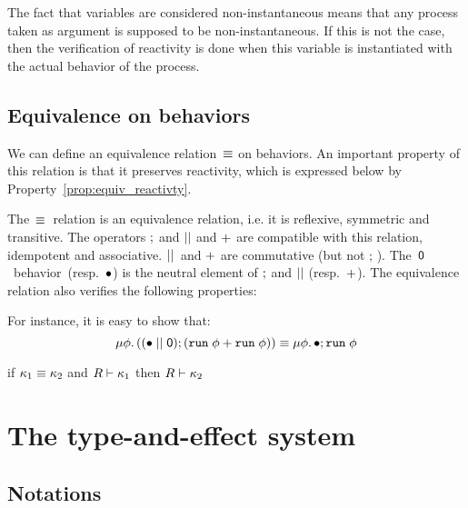 \documentclass[9pt,preprint]{sigplanconf}
\begin{document}
The fact that variables are considered non-instantaneous means that any process taken as argument is supposed to be non-instantan\-eous. If this is not the case, then the verification of reactivity is done when this variable is instantiated with the actual behavior of the process.

\subsection{Equivalence on behaviors}
\label{sec:equiv_behaviors}

We can define an equivalence relation~$\equiv$ on behaviors. An important property of this relation is that it preserves reactivity, which is expressed below by Property~\ref{prop:equiv_reactivty}.

The~$\equiv$~relation is an equivalence relation, i.e. it is reflexive, symmetric and transitive. The operators $;$ and $ \mid\mid $ and $+$ are compatible with this relation, idempotent and associative. $ \mid\mid $~and $+$ are commutative (but not $;\,$). The~$\textsf{0}$~behavior~(resp.~$\bullet$) is the neutral element of $;$ and $ \mid\mid $ (resp.~$+$). The equivalence relation also verifies the following properties:
%

For instance, it is easy to show that:
\[
\mu \phi.\, ((\bullet \mid\mid \textsf{0}) ; (\mathtt{run}\; \phi + \mathtt{run}\; \phi))  \equiv  \mu \phi.\, \bullet ; \mathtt{run}\; \phi
\]

\begin{property}
\label{prop:equiv_reactivty}
if $\kappa_1 \equiv \kappa_2$ and $R \vdash \kappa_1$ then $R \vdash \kappa_2$
\end{property}

\section{The type-and-effect system}
\label{sec:type_system}



\subsection{Notations}
\end{document}
